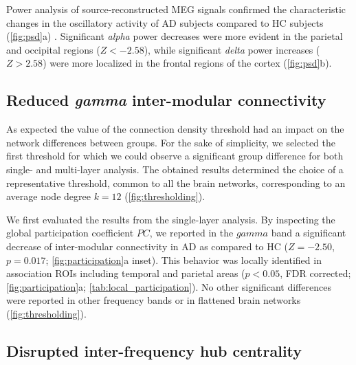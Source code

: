 
Power analysis of source-reconstructed MEG signals confirmed the characteristic changes in the oscillatory activity of AD subjects compared to HC subjects (\autoref{fig:psd}a) \citep{babiloni_mapping_2004,jeong_eeg_2004,dauwels_diagnosis_2010,wang_power_2015}. Significant \textit{alpha} power decreases were more evident in the parietal and occipital regions ($Z < -2.58$), while significant \textit{delta} power increases ($Z > 2.58$) were more localized in the frontal regions of the cortex (\autoref{fig:psd}b).

\subsection{Reduced \textit{gamma} inter-modular connectivity} \label{subsec:decreased_pc_in_gamma}

As expected the value of the connection density threshold had an impact on the network differences between groups. For the sake of simplicity, we selected the first threshold for which we could observe a significant group difference for both single- and multi-layer analysis. The obtained results determined the choice of a representative threshold, common to all the brain networks, corresponding to an average node degree $k=12$ (\autoref{fig:thresholding}).

We first evaluated the results from the single-layer analysis. By inspecting the global participation coefficient $PC$, we reported in the $gamma$ band a significant decrease of inter-modular connectivity in AD as compared to HC ($Z=-2.50$, $p=0.017$; \autoref{fig:participation}a inset).
This behavior was locally identified in association ROIs including temporal and parietal areas ($p < 0.05$, FDR corrected; \autoref{fig:participation}a; \autoref{tab:local_participation}).
No other significant differences were reported in other frequency bands or in flattened brain networks (\autoref{fig:thresholding}).



\subsection{Disrupted inter-frequency hub centrality}

